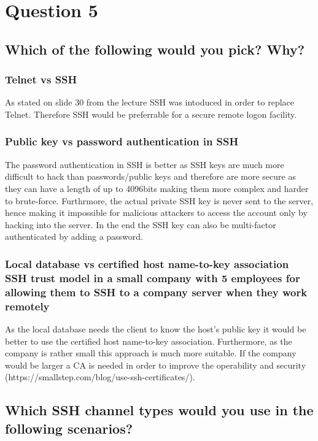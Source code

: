\documentclass{report}
\begin{document}
	\section{Question 5}
	\startsection
		\renewcommand{\thesubsection}{\thesection.\Alph{subsection}}
		\subsection{Which of the following would you pick? Why?}
		\startsubsection
			\subsubsection{Telnet vs SSH}
			\startsubsection
				As stated on slide 30 from the lecture SSH was intoduced in order to replace Telnet. Therefore SSH would be preferrable for a secure remote logon facility.
			\closesection
			\subsubsection{Public key vs password authentication in SSH}
			\startsubsection
				The password authentication in SSH is better as SSH keys are much more difficult to hack than passwords/public keys and therefore are more secure as they can have a length of up to 4096bits making them more complex and harder to brute-force. Furthrmore, the actual private SSH key is never sent to the server, hence making it impossible for malicious attackers to access the account only by hacking into the server. In the end the SSH key can also be multi-factor authenticated by adding a password.
			\closesection
			\subsubsection{Local database vs certified host name-to-key association SSH trust model in a small company with 5 employees for allowing them to SSH to a company server when they work remotely}
			\startsubsection
				As the local database needs the client to know the host’s public key it would be better to use the certified host name-to-key association. Furthermore, as the company is rather small this approach is much more suitable. If the company would be larger a CA is needed in order to improve the operability and security (https://smallstep.com/blog/use-ssh-certificates/).
			\closesection
		\closesection
		\subsection{Which SSH channel types would you use in the following scenarios?}
		\startsubsection
\end{document}
